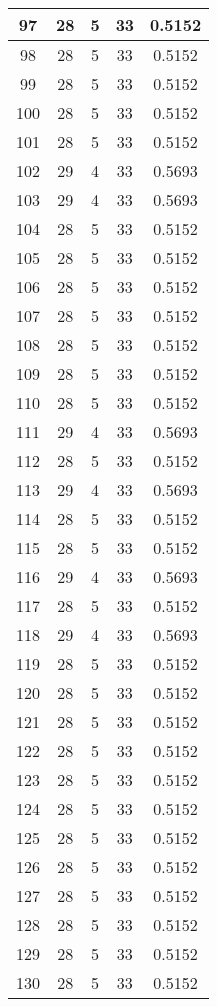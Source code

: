 \documentclass[letterpaper, 12pt]{article}
\begin{document}
\begin{longtable}{|c|c|c|c|c|}
\hline
97 & 28 & 5 & 33 & 0.5152 \\
\hline
98 & 28 & 5 & 33 & 0.5152 \\
\hline
99 & 28 & 5 & 33 & 0.5152 \\
\hline
100 & 28 & 5 & 33 & 0.5152 \\
\hline
101 & 28 & 5 & 33 & 0.5152 \\
\hline
102 & 29 & 4 & 33 & 0.5693 \\
\hline
103 & 29 & 4 & 33 & 0.5693 \\
\hline
104 & 28 & 5 & 33 & 0.5152 \\
\hline
105 & 28 & 5 & 33 & 0.5152 \\
\hline
106 & 28 & 5 & 33 & 0.5152 \\
\hline
107 & 28 & 5 & 33 & 0.5152 \\
\hline
108 & 28 & 5 & 33 & 0.5152 \\
\hline
109 & 28 & 5 & 33 & 0.5152 \\
\hline
110 & 28 & 5 & 33 & 0.5152 \\
\hline
111 & 29 & 4 & 33 & 0.5693 \\
\hline
112 & 28 & 5 & 33 & 0.5152 \\
\hline
113 & 29 & 4 & 33 & 0.5693 \\
\hline
114 & 28 & 5 & 33 & 0.5152 \\
\hline
115 & 28 & 5 & 33 & 0.5152 \\
\hline
116 & 29 & 4 & 33 & 0.5693 \\
\hline
117 & 28 & 5 & 33 & 0.5152 \\
\hline
118 & 29 & 4 & 33 & 0.5693 \\
\hline
119 & 28 & 5 & 33 & 0.5152 \\
\hline
120 & 28 & 5 & 33 & 0.5152 \\
\hline
121 & 28 & 5 & 33 & 0.5152 \\
\hline
122 & 28 & 5 & 33 & 0.5152 \\
\hline
123 & 28 & 5 & 33 & 0.5152 \\
\hline
124 & 28 & 5 & 33 & 0.5152 \\
\hline
125 & 28 & 5 & 33 & 0.5152 \\
\hline
126 & 28 & 5 & 33 & 0.5152 \\
\hline
127 & 28 & 5 & 33 & 0.5152 \\
\hline
128 & 28 & 5 & 33 & 0.5152 \\
\hline
129 & 28 & 5 & 33 & 0.5152 \\
\hline
130 & 28 & 5 & 33 & 0.5152 \\

\end{longtable}
\end{document}
